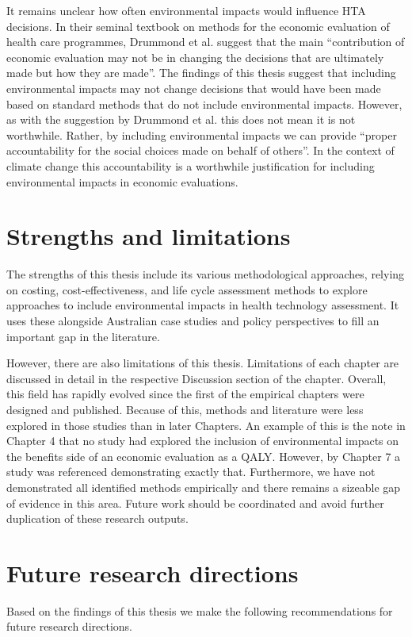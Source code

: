 \begin{refsection}
It remains unclear how often environmental impacts would influence HTA decisions. In their seminal textbook on methods for the economic evaluation of health care programmes, Drummond et al. suggest that the main “contribution of economic evaluation may not be in changing the decisions that are ultimately made but how they are made”.\cite{drummond_methods_2015} The findings of this thesis suggest that including environmental impacts may not change decisions that would have been made based on standard methods that do not include environmental impacts. However, as with the suggestion by Drummond et al. this does not mean it is not worthwhile. Rather, by including environmental impacts we can provide “proper accountability for the social choices made on behalf of others”.\cite{drummond_methods_2015} In the context of climate change this accountability is a worthwhile justification for including environmental impacts in economic evaluations. 

\section{Strengths and limitations}
The strengths of this thesis include its various methodological approaches, relying on costing, cost-effectiveness, and life cycle assessment methods to explore approaches to include environmental impacts in health technology assessment. It uses these alongside Australian case studies and policy perspectives to fill an important gap in the literature.

However, there are also limitations of this thesis. Limitations of each chapter are discussed in detail in the respective Discussion section of the chapter. Overall, this field has rapidly evolved since the first of the empirical chapters were designed and published. Because of this, methods and literature were less explored in those studies than in later Chapters. An example of this is the note in Chapter 4 that no study had explored the inclusion of environmental impacts on the benefits side of an economic evaluation as a QALY. However, by Chapter 7 a study was referenced demonstrating exactly that. Furthermore, we have not demonstrated all identified methods empirically and there remains a sizeable gap of evidence in this area. Future work should be coordinated and avoid further duplication of these research outputs.\cite{hensher_climate_2023}

\section{Future research directions}
Based on the findings of this thesis we make the following recommendations for future research directions.


\end{refsection}
